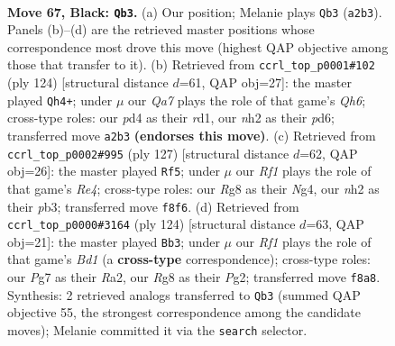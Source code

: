 \documentclass[11pt]{article}
\begin{document}
\clearpage

\begin{figure}[p]\centering
\begin{subfigure}{0.46\textwidth}\centering
\resizebox{\linewidth}{!}{%
\newchessgame
\chessboard[
  setfen={5rr1/p5p1/3Q3p/1k1p3P/p2P2P1/4P2K/q6N/4b3 b - - 43 67},
  showmover=false,
  pgfstyle=straightmove, color=movearrow, markmove={a2-b3}
]}
\caption{}
\end{subfigure}\hfill
\begin{subfigure}{0.46\textwidth}\centering
\resizebox{\linewidth}{!}{%
\newchessgame
\chessboard[
  setfen={8/4kp2/3p3Q/2qPp3/8/P4PP1/1P3RK1/3r4 w - - 11 63},
  showmover=false,
  pgfstyle=straightmove, color=movearrow, markmove={h6-h4}
]}
\caption{}
\end{subfigure}
\\[4pt]
\begin{subfigure}{0.46\textwidth}\centering
\resizebox{\linewidth}{!}{%
\newchessgame
\chessboard[
  setfen={6k1/5p2/p5p1/2p1r2p/6nP/PPQ3PN/5PK1/3r4 b - - 45 64},
  showmover=false,
  pgfstyle=straightmove, color=movearrow, markmove={e5-f5}
]}
\caption{}
\end{subfigure}\hfill
\begin{subfigure}{0.46\textwidth}\centering
\resizebox{\linewidth}{!}{%
\newchessgame
\chessboard[
  setfen={2k5/2n3p1/2b1p2p/4Pp1P/1P1Q4/2p5/R5PK/3Bq3 w - - 0 63},
  showmover=false,
  pgfstyle=straightmove, color=movearrow, markmove={d1-b3}
]}
\caption{}
\end{subfigure}
\caption{\textbf{Move 67, Black: \texttt{Qb3}.} (a) Our position; Melanie plays \texttt{Qb3} (\texttt{a2b3}). Panels (b)--(d) are the retrieved master positions whose correspondence most drove this move (highest QAP objective among those that transfer to it). (b) Retrieved from \texttt{ccrl\_top\_p0001\#102} (ply 124) [structural distance $d$=61, QAP obj=27]: the master played \texttt{Qh4+}; under $\mu$ our \emph{Qa7} plays the role of that game's \emph{Qh6}; cross-type roles: our \emph{p}d4 as their \emph{r}d1, our \emph{n}h2 as their \emph{p}d6; transferred move \texttt{a2b3} \textbf{(endorses this move)}. (c) Retrieved from \texttt{ccrl\_top\_p0002\#995} (ply 127) [structural distance $d$=62, QAP obj=26]: the master played \texttt{Rf5}; under $\mu$ our \emph{Rf1} plays the role of that game's \emph{Re4}; cross-type roles: our \emph{R}g8 as their \emph{N}g4, our \emph{n}h2 as their \emph{p}b3; transferred move \texttt{f8f6}. (d) Retrieved from \texttt{ccrl\_top\_p0000\#3164} (ply 124) [structural distance $d$=63, QAP obj=21]: the master played \texttt{Bb3}; under $\mu$ our \emph{Rf1} plays the role of that game's \emph{Bd1} (a \textbf{cross-type} correspondence); cross-type roles: our \emph{P}g7 as their \emph{R}a2, our \emph{R}g8 as their \emph{P}g2; transferred move \texttt{f8a8}. Synthesis: 2 retrieved analogs transferred to \texttt{Qb3} (summed QAP objective 55, the strongest correspondence among the candidate moves); Melanie committed it via the \texttt{search} selector.}
\label{fig:thought-m133}
\end{figure}
\end{document}
